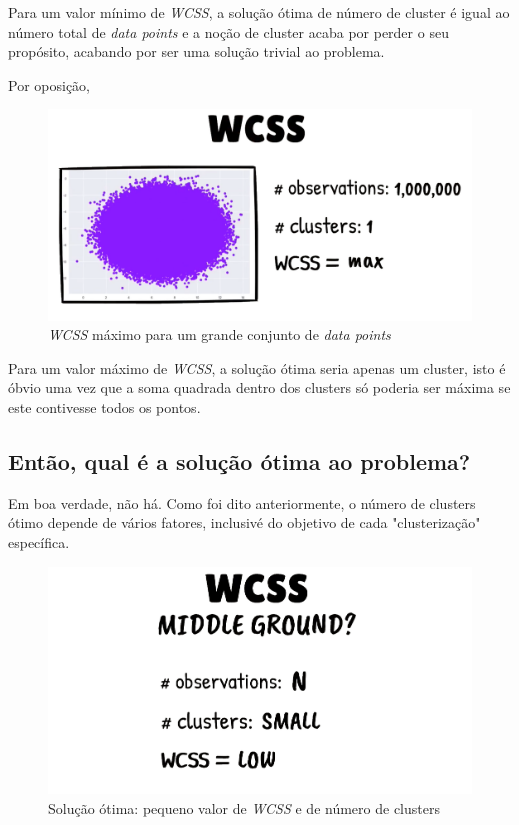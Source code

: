 \documentclass[12pt, a4paper, oneside]{scrreport}
\begin{document}
Para um valor mínimo de \textit{WCSS}, a solução ótima de número de cluster é igual ao número total de \textit{data points} e a noção de cluster acaba por perder o seu propósito, acabando por ser uma solução trivial ao problema.
\newpage
\par Por oposição,  


\begin{figure}[h!]
\centering
\includegraphics[scale=0.3]{wcss_maximize}
\caption{\textit{WCSS} máximo para um grande conjunto de \textit{data points}}
\end{figure}


\noindent Para um valor máximo de \textit{WCSS}, a solução ótima seria apenas um cluster, isto é óbvio uma vez que a soma quadrada dentro dos clusters só poderia ser máxima se este contivesse todos os pontos.

\subsection{Então, qual é a solução ótima ao problema?}
\quad Em boa verdade, não há. 
Como foi dito anteriormente, o número de clusters ótimo depende de vários fatores, inclusivé do objetivo de cada "clusterização" específica. 


\begin{figure}[h!]
\centering
\includegraphics[scale=0.3]{wcss_otimo}
\caption{Solução ótima: pequeno valor de \textit{WCSS} e de número de clusters}
\end{figure}
\end{document}
